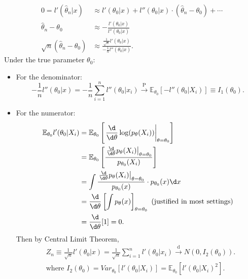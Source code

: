 \documentclass[a4paper]{article}
\begin{document}
\begin{equation}
	\begin{aligned}
		0 = l'(\hat{\theta}_n|x) &\approx l'(\theta_0|x) + l''(\theta_0|x) \cdot (\hat{\theta}_n - \theta_0) + \cdots\\
		\hat{\theta}_n - \theta_0 &\approx - \frac{l'(\theta_0|x)}{l''(\theta_0|x)} \\
		\sqrt{n} (\hat{\theta}_n - \theta_0) &\approx \frac{\frac{1}{\sqrt{n}}l'(\theta_0|x)}{-\frac{1}{n}l''(\theta_0|x)}.
	\end{aligned}
\end{equation}
Under the true parameter $\theta_0$:
\begin{itemize}
	\item For the denominator:
	\begin{equation}
		-\frac{1}{n}l''(\theta_0|x) = -\frac{1}{n}\sum\limits_{i=1}^n l''(\theta_0|x_i) \stackrel{\text{P}}{\longrightarrow} \mathbb{E}_{\theta_0}[-l''(\theta_0|X_i)] \equiv I_1(\theta_0).
	\end{equation}
	\item For the numerator:
	\begin{equation}
		\begin{aligned}
			\mathbb{E}_{\theta_0}l'(\theta_0|X_i) &= \mathbb{E}_{\theta_0}\left[\left.\frac{\d}{\d\theta}\log(p_{\theta}(X_i))\right |_{\theta = \theta_0}\right] \\
			&= \mathbb{E}_{\theta_0}\left[\frac{\left.\frac{\d}{\d \theta}p_{\theta}(X_i)\right |_{\theta = \theta_0}}{p_{\theta_0}(X_i)}\right] \\
			&= \int \frac{\left.\frac{\d}{\d \theta}p_{\theta}(X_i)\right |_{\theta = \theta_0}}{p_{\theta_0}(x)} \cdot p_{\theta_0}(x) \d x \\
			&= \frac{\d}{\d \theta}\left[\int p_{\theta}(x)\right]_{\theta=\theta_0} \text{ (justified in most settings)} \\
			&= \frac{\d}{\d \theta}[1] = 0.
		\end{aligned}
	\end{equation}
	Then by Central Limit Theorem,
	\begin{equation}
		\begin{aligned}
			& Z_n \equiv \frac{1}{\sqrt{n}}l'(\theta_0|x) = \frac{1}{\sqrt{n}} \sum\limits_{i=1}^nl'(\theta_0|x_i) \stackrel{\text{d}}{\longrightarrow} N(0,I_2(\theta_0)).\\
			& \text{where } I_2(\theta_0) = Var_{\theta_0}[l'(\theta_0|X_i)] = \mathbb{E}_{\theta_0}[l'(\theta_0|X_i)^2].
		\end{aligned}

\end{equation}
\end{itemize}
\end{document}
